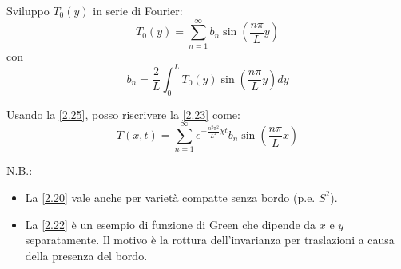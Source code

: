 \documentclass[a4paper,11pt]{report}
\begin{document}
Sviluppo $T_0(y)$ in serie di Fourier: 
\begin{equation}
T_0(y)=\sum_{n=1}^{\infty}b_n\sin{\left(\frac{n\pi}{L}y\right)}
\label{2.24}
\end{equation}
con 
\begin{equation}
b_n=\frac{2}{L}\int_0^LT_0(y)\sin{\left(\frac{n\pi}{L}y\right)} dy
\label{2.25}
\end{equation}

Usando la \eqref{2.25}, posso riscrivere la \eqref{2.23} come:
\begin{equation}
T(x,t)=\sum_{n=1}^{\infty}e^{-\frac{n^2\pi^2}{L^2}\chi t}b_n\sin{\left(\frac{n\pi}{L}x\right)}
\end{equation}

N.B.: 
\begin{itemize}
\item La \eqref{2.20} vale anche per variet\`a compatte senza bordo (p.e. $S^2$).
\item La \eqref{2.22} \`e un esempio di funzione di Green che dipende da $x$ e $y$ separatamente. Il motivo \`e la rottura dell'invarianza per traslazioni a causa della presenza del bordo.
\end{itemize}

\medskip
\end{document}
